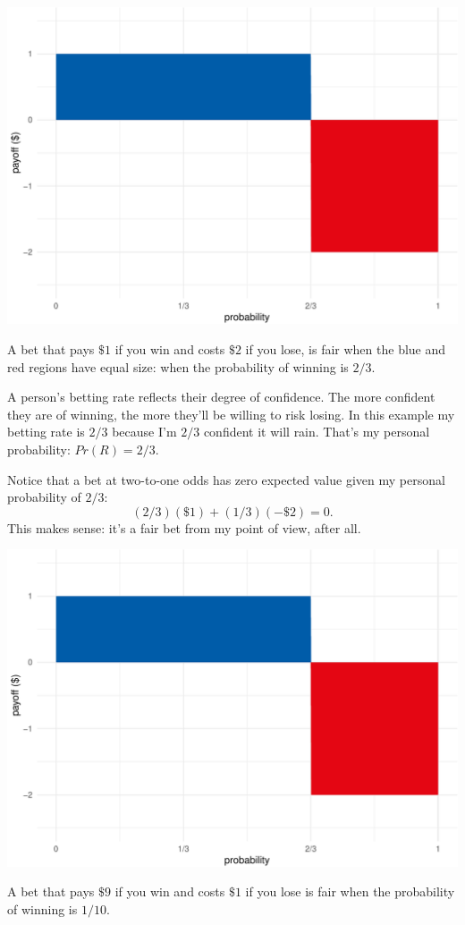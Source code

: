 \documentclass[justified]{tufte-book}
\newcommand{\p}{Pr}
\theoremstyle{definition}
\theoremstyle{definition}
\theoremstyle{definition}
\theoremstyle{remark}
\begin{document}
\begin{marginfigure}
\includegraphics{_main_files/figure-latex/unnamed-chunk-119-1} \caption[A bet that pays $\$1$ if you win and costs $\$2$ if you lose, is fair when the blue and red regions have equal size]{A bet that pays $\$1$ if you win and costs $\$2$ if you lose, is fair when the blue and red regions have equal size: when the probability of winning is $2/3$.}\label{fig:unnamed-chunk-119}
\end{marginfigure}

A person's betting rate reflects their degree of confidence. The more
confident they are of winning, the more they'll be willing to risk
losing. In this example my betting rate is \(2/3\) because I'm \(2/3\)
confident it will rain. That's my personal probability: \(\p(R) = 2/3\).

Notice that a bet at two-to-one odds has zero expected value given my
personal probability of \(2/3\): \[ (2/3)(\$1) + (1/3)(-\$2) = 0. \]
This makes sense: it's a fair bet from my point of view, after all.

\begin{marginfigure}
\includegraphics{_main_files/figure-latex/unnamed-chunk-120-1} \caption[A bet that pays $\$9$ if you win and costs $\$1$ if you lose is fair when the probability of winning is $1/10$]{A bet that pays $\$9$ if you win and costs $\$1$ if you lose is fair when the probability of winning is $1/10$.}\label{fig:unnamed-chunk-120}
\end{marginfigure}
\end{document}
